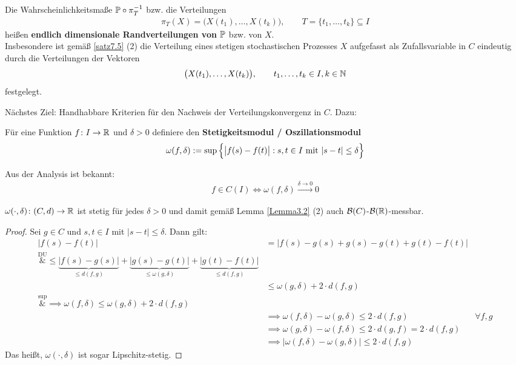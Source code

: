 \begin{bemerkungnr} %
	Die Wahrscheinlichkeitsmaße $\P\circ\pi_T^{-1}$ bzw. die Verteilungen
	\begin{align*}
		\pi_T(X)=\big(X(t_1),\ldots,X(t_k)\big),\qquad T=\big\lbrace t_1,\ldots,t_k\rbrace\subseteq I
	\end{align*}
	heißen \textbf{endlich dimensionale Randverteilungen von $\P$} bzw. von $X$.\\
	Insbesondere ist gemäß \ref{satz7.5} (2) die Verteilung eines stetigen stochastischen Prozesses $X$ aufgefasst als Zufallsvariable in $C$ eindeutig durch die Verteilungen der Vektoren
	\begin{align*}
		\big(X(t_1),\ldots,X(t_k)\big),\qquad t_1,\ldots,t_k\in I,k\in\N
	\end{align*}
	festgelegt.
\end{bemerkungnr}

Nächstes Ziel: Handhabbare Kriterien für den Nachweis der Verteilungskonvergenz in $C$. Dazu:

\begin{definition} %
	Für eine Funktion $f\colon I\to\R$ und $\delta>0$ definiere den \textbf{Stetigkeitsmodul / Oszillationsmodul}
	\begin{align*}
		\omega(f,\delta):=\sup\limits\Big\lbrace \big|f(s)-f(t)\big|:s,t\in I\mit |s-t|\leq\delta\Big\rbrace
	\end{align*}
\end{definition}

Aus der Analysis ist bekannt:
\begin{align*}
	f\in C(I)\Longleftrightarrow\omega(f,\delta)\stackrel{\delta\to0}{\longrightarrow}0
\end{align*}

\begin{lemma}\label{lemma7.8}
	$\omega(\cdot,\delta)\colon (C,d)\to\R$ ist stetig für jedes $\delta>0$ und damit gemäß Lemma \ref{Lemma3.2} (2) auch $\B(C)$-$\B(\R)$-messbar.
\end{lemma}

\begin{proof}
	Sei $g\in C$ und $s,t\in I$ mit $|s-t|\leq\delta$. 
	Dann gilt:
	\begin{align*}
		\big| f(s)-f(t)\big|
		&=\big|f(s)-g(s)+g(s)-g(t)+g(t)-f(t)\big|\\
		\overset{\text{DU}}&{\leq}
		\underbrace{\big|f(s)-g(s)\big|}_{\leq d(f,g)}+\underbrace{\big| g(s)-g(t)\big|}_{\leq\omega(g,\delta)}+\underbrace{\big| g(t)-f(t)\big|}_{\leq d(f,g)}\\
		&\leq
		\omega(g,\delta)+2\cdot d(f,g)\\
		\overset{\sup}&{\implies}
		\omega(f,\delta)
		\leq\omega(g,\delta)+2\cdot d(f,g)\\
		&\implies \omega(f,\delta)-\omega(g,\delta)
		\leq 2\cdot d(f,g) &\forall f,g\\
		&\implies \omega(g,\delta)-\omega(f,\delta)
		\leq 2\cdot d(g,f)=2\cdot d(f,g)\\
		&\implies
		\big|\omega(f,\delta)-\omega(g,\delta)\big|\leq 2\cdot d(f,g)
	\end{align*}
	Das heißt, $\omega(\cdot,\delta)$ ist sogar Lipschitz-stetig.
\end{proof}

